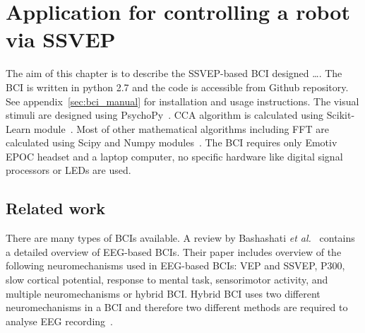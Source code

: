 
\chapter{Application for controlling a robot via SSVEP}
\label{sec:SSVEP_BCI}

The aim of this chapter is to describe the \gls{SSVEP}-based \gls{BCI} designed \dots. The \gls{BCI} is written in python 2.7 and the code is accessible from Github repository. See appendix~\ref{sec:bci_manual} for installation and usage instructions. The visual stimuli are designed using PsychoPy~\cite{psychopy}. \gls{CCA} algorithm is calculated using Scikit-Learn module~\cite{scikit-learn}. Most of other mathematical algorithms including \gls{FFT} are calculated using Scipy and Numpy modules~\cite{scipy}. The \gls{BCI} requires only Emotiv EPOC headset and a laptop computer, no specific hardware like digital signal processors or \glspl{LED} are used.

\section{Related work}

There are many types of \glspl{BCI} available. A review by Bashashati \textit{et al.}~\cite{bci_comparison} contains a detailed overview of \gls{EEG}-based \glspl{BCI}. Their paper includes overview of the following neuromechanisms used in \gls{EEG}-based \glspl{BCI}: \gls{VEP} and \gls{SSVEP}, P300, slow cortical potential, response to mental task, sensorimotor activity, and multiple neuromechanisms or hybrid \gls{BCI}. Hybrid \gls{BCI} uses two different neuromechanisms in a \gls{BCI} and therefore two different methods are required to analyse \gls{EEG} recording~\cite{hybrid_bci, hybrid_bci2}. %

